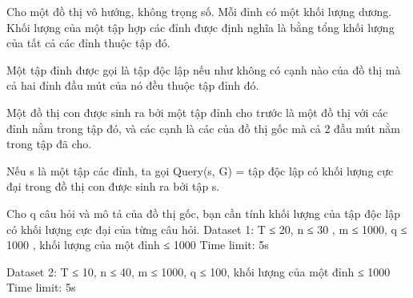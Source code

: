 Cho một đồ thị vô hướng, không trọng số. Mỗi đỉnh có một khối lượng dương. Khối lượng của một tập hợp các đỉnh được định nghĩa là bằng tổng khối lượng của tất cả các đỉnh thuộc tập đó.  

   Một tập đỉnh được gọi là tập độc lập nếu như không có cạnh nào của đồ thị mà cả hai đỉnh đầu mút của nó đều thuộc tập đỉnh đó.  

   Một đồ thị con được sinh ra bởi một tập đỉnh cho trước là một đồ thị với các đỉnh nằm trong tập đó, và các cạnh là các của đồ thị gốc mà cả 2 đầu mút nằm trong tập đã cho.  

   Nếu s là một tập các đỉnh, ta gọi Query(s, G) = tập độc lập có khối lượng cực đại trong đồ thị con được sinh ra bởi tập s.  

   Cho q câu hỏi và mô tả của đồ thị gốc, bạn cần tính khối lượng của tập độc lập có khối lượng cực đại của từng câu hỏi.
Dataset 1: T ≤ 20, n ≤ 30 , m ≤ 1000, q ≤ 1000 , khối lượng của một đỉnh ≤ 1000 Time limit: 5s  

   Dataset 2: T ≤ 10, n ≤ 40, m ≤ 1000, q ≤ 100, khối lượng của một đỉnh ≤ 1000 Time limit: 5s